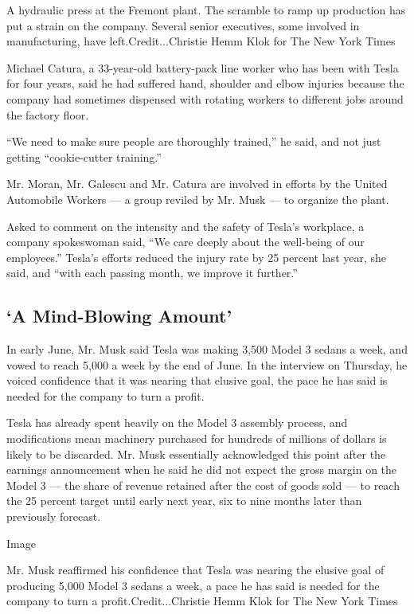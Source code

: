 A hydraulic press at the Fremont plant. The scramble to ramp up
production has put a strain on the company. Several senior executives,
some involved in manufacturing, have left.Credit...Christie Hemm Klok
for The New York Times

Michael Catura, a 33-year-old battery-pack line worker who has been with
Tesla for four years, said he had suffered hand, shoulder and elbow
injuries because the company had sometimes dispensed with rotating
workers to different jobs around the factory floor.

``We need to make sure people are thoroughly trained,'' he said, and not
just getting ``cookie-cutter training.''

Mr. Moran, Mr. Galescu and Mr. Catura are involved in efforts by the
United Automobile Workers --- a group reviled by Mr. Musk --- to
organize the plant.

Asked to comment on the intensity and the safety of Tesla's workplace, a
company spokeswoman said, ``We care deeply about the well-being of our
employees.'' Tesla's efforts reduced the injury rate by 25 percent last
year, she said, and ``with each passing month, we improve it further.''

\hypertarget{a-mind-blowing-amount}{%
\subsection{`A Mind-Blowing Amount'}\label{a-mind-blowing-amount}}

In early June, Mr. Musk said Tesla was making 3,500 Model 3 sedans a
week, and vowed to reach 5,000 a week by the end of June. In the
interview on Thursday, he voiced confidence that it was nearing that
elusive goal, the pace he has said is needed for the company to turn a
profit.

Tesla has already spent heavily on the Model 3 assembly process, and
modifications mean machinery purchased for hundreds of millions of
dollars is likely to be discarded. Mr. Musk essentially acknowledged
this point after the earnings announcement when he said he did not
expect the gross margin on the Model 3 --- the share of revenue retained
after the cost of goods sold --- to reach the 25 percent target until
early next year, six to nine months later than previously forecast.

Image

Mr. Musk reaffirmed his confidence that Tesla was nearing the elusive
goal of producing 5,000 Model 3 sedans a week, a pace he has said is
needed for the company to turn a profit.Credit...Christie Hemm Klok for
The New York Times

